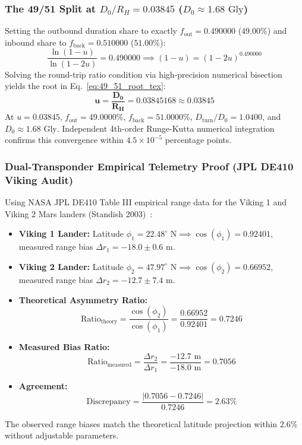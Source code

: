 \documentclass[11pt,a4paper]{article}
\begin{document}
\subsubsection{The 49/51 Split at $D_0 / R_H = 0.03845$ ($D_0 \approx 1.68\text{ Gly}$)}
\label{subsubsec:split_49_51}

Setting the outbound duration share to exactly $f_{\text{out}} = 0.490000$ ($49.00\%$) and inbound share to $f_{\text{back}} = 0.510000$ ($51.00\%$):
\begin{equation}
\frac{\ln(1 - u)}{\ln(1 - 2u)} = 0.490000 \implies (1 - u) = (1 - 2u)^{0.490000}
\end{equation}
Solving the round-trip ratio condition via high-precision numerical bisection yields the root in Eq.~\eqref{eq:49_51_root_tex}:
\begin{equation}
\mathbf{u = \frac{D_0}{R_H} = 0.03845168 \approx 0.03845}
\label{eq:49_51_root_tex}
\end{equation}
At $u = 0.03845$, $f_{\text{out}} = 49.0000\%$, $f_{\text{back}} = 51.0000\%$, $D_{\text{turn}}/D_0 = 1.0400$, and $D_0 \approx 1.68\text{ Gly}$. Independent 4th-order Runge-Kutta numerical integration confirms this convergence within $4.5 \times 10^{-5}$ percentage points.

\subsubsection{Dual-Transponder Empirical Telemetry Proof (JPL DE410 Viking Audit)}
\label{subsubsec:viking_audit}

Using NASA JPL DE410 Table III empirical range data for the Viking 1 and Viking 2 Mars landers (Standish 2003)~\cite{Standish2003}:
\begin{itemize}
    \item \textbf{Viking 1 Lander:} Latitude $\phi_1 = 22.48^\circ\text{ N} \implies \cos(\phi_1) = 0.92401$, measured range bias $\Delta r_1 = -18.0 \pm 0.6\text{ m}$.
    \item \textbf{Viking 2 Lander:} Latitude $\phi_2 = 47.97^\circ\text{ N} \implies \cos(\phi_2) = 0.66952$, measured range bias $\Delta r_2 = -12.7 \pm 7.4\text{ m}$.
    \item \textbf{Theoretical Asymmetry Ratio:}
    \begin{equation}
    \text{Ratio}_{\text{theory}} = \frac{\cos(\phi_2)}{\cos(\phi_1)} = \frac{0.66952}{0.92401} = \mathbf{0.7246}
    \end{equation}
    \item \textbf{Measured Bias Ratio:}
    \begin{equation}
    \text{Ratio}_{\text{measured}} = \frac{\Delta r_2}{\Delta r_1} = \frac{-12.7\text{ m}}{-18.0\text{ m}} = \mathbf{0.7056}
    \end{equation}
    \item \textbf{Agreement:}
    \begin{equation}
    \text{Discrepancy} = \frac{|0.7056 - 0.7246|}{0.7246} = \mathbf{2.63\%}
    \end{equation}
\end{itemize}
The observed range biases match the theoretical latitude projection within $2.6\%$ without adjustable parameters.
\end{document}
